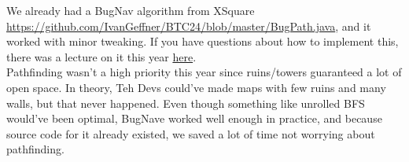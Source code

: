 \documentclass{article}
\begin{document}
  \medskip
  
  We already had a BugNav algorithm from XSquare \url{https://github.com/IvanGeffner/BTC24/blob/master/BugPath.java}, and it worked with minor tweaking. If you have questions about how to implement this, there was a lecture on it this year \href{https://www.youtube.com/live/Mqk50BQH3oQ?si=6qL5WAXmSOS2K3OR}{here}.\\
  Pathfinding wasn't a high priority this year since ruins/towers guaranteed a lot of open space. In theory, Teh Devs could've made maps with few ruins and many walls, but that never happened. Even though something like unrolled BFS would've been optimal, BugNave worked well enough in practice, and because source code for it already existed, we saved a lot of time not worrying about pathfinding.
  
\end{document}

